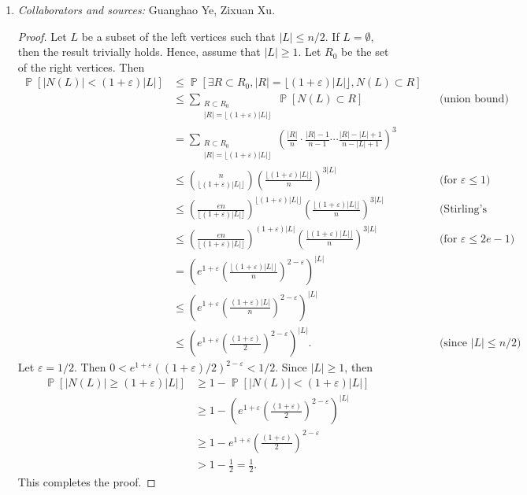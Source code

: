\documentclass[letterpaper, reqno,11pt]{article}
\newcommand{\PP}{\mathop{{}\mathbb{P}}}
\begin{document}
\begin{enumerate}
  \item \noindent\emph{Collaborators and sources:} Guanghao Ye, Zixuan Xu.
  
  \begin{proof}
    Let $L$ be a subset of the left vertices such that $|L| \leq n/2$. If $L = \emptyset$, then the result trivially holds. Hence, assume that $|L| \geq 1$. Let $R_0$ be the set of the right vertices. Then
    \begin{align*}
      \PP[|N(L)| < (1 + \varepsilon) |L|] &\leq \PP\left[\exists R \subset R_0, |R| = \lfloor (1 + \varepsilon)|L| \rfloor, N(L) \subset R\right] \\
      &\leq \sum_{\substack{R \subset R_0 \\ |R| = \lfloor (1 + \varepsilon) |L| \rfloor}} \PP[N(L) \subset R] && \text{(union bound)} \\
      &= \sum_{\substack{R \subset R_0 \\ |R| = \lfloor (1 + \varepsilon) |L| \rfloor}} \left(\frac{|R|}{n} \cdot \frac{|R| - 1}{n - 1} \cdots \frac{|R| - |L| + 1}{n - |L| + 1}\right)^3 \\
      &\leq \binom{n}{\lfloor (1 + \varepsilon) |L| \rfloor} \left(\frac{\lfloor (1 + \varepsilon) |L| \rfloor}{n}\right)^{3|L|} && \text{(for $\varepsilon \leq 1$)} \\
      &\leq \left(\frac{en}{\lfloor (1 + \varepsilon) |L| \rfloor}\right)^{\lfloor (1 + \varepsilon) |L| \rfloor} \left(\frac{\lfloor (1 + \varepsilon) |L| \rfloor}{n}\right)^{3|L|} && \text{(Stirling's approximation)} \\
      &\leq \left(\frac{en}{\lfloor (1 + \varepsilon) |L| \rfloor}\right)^{(1 + \varepsilon) |L|} \left(\frac{\lfloor (1 + \varepsilon) |L| \rfloor}{n}\right)^{3|L|} && \text{(for $\varepsilon \leq 2e - 1$)} \\
      &= \left(e^{1 + \varepsilon} \left(\frac{\lfloor (1 + \varepsilon) |L| \rfloor}{n}\right)^{2 - \varepsilon}\right)^{|L|} \\
      &\leq \left(e^{1 + \varepsilon} \left(\frac{(1 + \varepsilon) |L|}{n}\right)^{2 - \varepsilon}\right)^{|L|} \\
      &\leq \left(e^{1 + \varepsilon} \left(\frac{(1 + \varepsilon)}{2}\right)^{2 - \varepsilon}\right)^{|L|}. && \text{(since $|L| \leq n/2$)}
    \end{align*}
    Let $\varepsilon = 1/2$. Then $0 < e^{1 + \varepsilon} ((1 + \varepsilon)/2)^{2 - \varepsilon} < 1/2$. Since $|L| \geq 1$, then
    \begin{align*}
      \PP[|N(L)| \geq (1 + \varepsilon) |L|] &\geq 1 - \PP[|N(L)| < (1 + \varepsilon) |L|] \\
      &\geq 1 - \left(e^{1 + \varepsilon} \left(\frac{(1 + \varepsilon)}{2}\right)^{2 - \varepsilon}\right)^{|L|} \\
      &\geq 1 - e^{1 + \varepsilon} \left(\frac{(1 + \varepsilon)}{2}\right)^{2 - \varepsilon} \\
      &> 1 - \frac{1}{2} = \frac{1}{2}.
    \end{align*}
    This completes the proof.
  \end{proof}


\end{enumerate}
\end{document}
